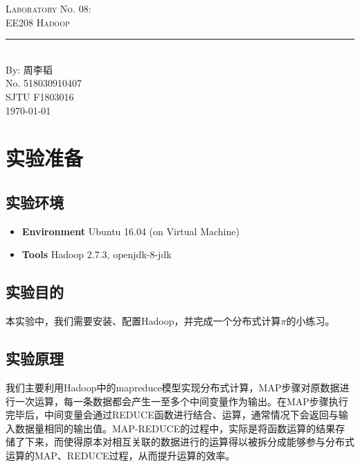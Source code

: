 \documentclass{article}
\newcommand{\labno}{08}
\newcommand{\labtitle}{EE208 Hadoop}
\newcommand{\authorname}{周李韬}
\newcommand{\studentno}{518030910407}
\newcommand{\classno}{F1803016}
\begin{document}
\begin{center}
{\LARGE \textsc{Laboratory No. \labno:} \\ \vspace{4pt}}
{\Large \textsc{\labtitle} \\ \vspace{4pt}} 
\rule[13pt]{\textwidth}{1pt} \\ \vspace{15pt}
{\large By: \authorname \\ \vspace{10pt}
No. \studentno \\ \vspace{10pt}
SJTU \classno \\ \vspace{10pt}
\today \vspace{20pt}}
\end{center}



\section{实验准备}

\subsection{实验环境}
\begin{itemize}
\item\textbf{Environment} Ubuntu 16.04 (on Virtual Machine)
\item\textbf{Tools} Hadoop 2.7.3, openjdk-8-jdk
\end{itemize}

\subsection{实验目的}

本实验中，我们需要安装、配置Hadoop，并完成一个分布式计算$\pi$的小练习。

\subsection{实验原理}
我们主要利用Hadoop中的mapreduce模型实现分布式计算，MAP步骤对原数据进行一次运算，每一条数据都会产生一至多个中间变量作为输出。在MAP步骤执行完毕后，中间变量会通过REDUCE函数进行结合、运算，通常情况下会返回与输入数据量相同的输出值。MAP-REDUCE的过程中，实际是将函数运算的结果存储了下来，而使得原本对相互关联的数据进行的运算得以被拆分成能够参与分布式运算的MAP、REDUCE过程，从而提升运算的效率。
\end{document}
